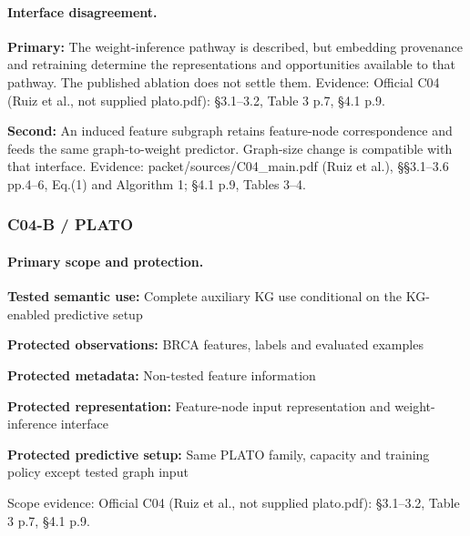 \documentclass[10pt]{article}
\begin{document}
\paragraph{Interface disagreement.}
\textbf{Primary:} The weight-inference pathway is described, but embedding provenance and retraining determine the representations and opportunities available to that pathway. The published ablation does not settle them. Evidence: Official C04 (Ruiz et al., not supplied plato.pdf): §3.1--3.2, Table 3 p.7, §4.1 p.9.\par
\textbf{Second:} An induced feature subgraph retains feature-node correspondence and feeds the same graph-to-weight predictor. Graph-size change is compatible with that interface. Evidence: packet/sources/C04\_main.pdf (Ruiz et al.), §§3.1--3.6 pp.4--6, Eq.(1) and Algorithm 1; §4.1 p.9, Tables 3--4.\par
\subsubsection*{C04-B / PLATO}
\paragraph{Primary scope and protection.}
\textbf{Tested semantic use:} Complete auxiliary KG use conditional on the KG-enabled predictive setup\par
\textbf{Protected observations:} BRCA features, labels and evaluated examples\par
\textbf{Protected metadata:} Non-tested feature information\par
\textbf{Protected representation:} Feature-node input representation and weight-inference interface\par
\textbf{Protected predictive setup:} Same PLATO family, capacity and training policy except tested graph input\par
Scope evidence: Official C04 (Ruiz et al., not supplied plato.pdf): §3.1--3.2, Table 3 p.7, §4.1 p.9.\par
\end{document}
